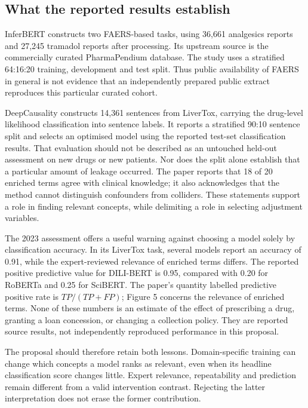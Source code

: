 \subsection{What the reported results establish}

InferBERT constructs two FAERS-based tasks, using 36,661 analgesics reports
and 27,245 tramadol reports after processing. Its upstream source is the
commercially curated PharmaPendium database. The study uses a stratified
64:16:20 training, development and test split. Thus public availability of
FAERS in general is not evidence that an independently prepared public
extract reproduces this particular curated cohort.
\citep[pp.~3--4, Table 1]{closure30inferbert}

DeepCausality constructs 14,361 sentences from LiverTox, carrying the
drug-level likelihood classification into sentence labels. It reports a
stratified 90:10 sentence split and selects an optimised model using the
reported test-set classification results. That evaluation should not be
described as an untouched held-out assessment on new drugs or new patients.
Nor does the split alone establish that a particular amount of leakage
occurred. The paper reports that 18 of 20 enriched terms agree with clinical
knowledge; it also acknowledges that the method cannot distinguish
confounders from colliders. These statements support a role in finding
relevant concepts, while delimiting a role in selecting adjustment variables.
\citep[pp.~5--8, Table 1; pp.~9--11, Table 2 and Discussion]
{closure30deepcausality}

The 2023 assessment offers a useful warning against choosing a model solely
by classification accuracy. In its LiverTox task, several models report an
accuracy of 0.91, while the expert-reviewed relevance of enriched terms
differs. The reported positive predictive value for DILI-BERT is 0.95,
compared with 0.20 for RoBERTa and 0.25 for SciBERT. The paper's quantity
labelled predictive positive rate is $TP/(TP+FP)$; Figure 5 concerns the
relevance of enriched terms. None of these numbers is an estimate of the
effect of prescribing a drug, granting a loan concession, or changing a
collection policy. They are reported source results, not independently
reproduced performance in this proposal.
\citep[pp.~1911--1916, Table 4 and Figure 5]{closure30pharma}

The proposal should therefore retain both lessons. Domain-specific training
can change which concepts a model ranks as relevant, even when its headline
classification score changes little. Expert relevance, repeatability and
prediction remain different from a valid intervention contrast. Rejecting
the latter interpretation does not erase the former contribution.

